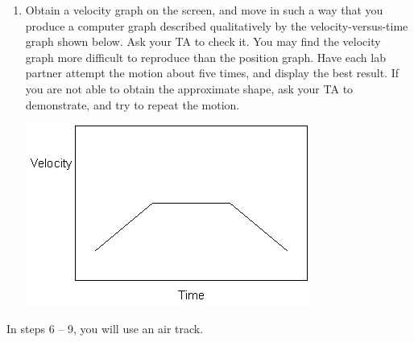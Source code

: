 \begin{enumerate}[label=\arabic*.]
\item Obtain a velocity graph on the screen, and move in such a way that you produce a computer graph described qualitatively by the velocity-versus-time graph shown below.  Ask your TA to check it.  You may find the velocity graph more difficult to reproduce than the position graph.  Have each lab partner attempt the motion about five times, and display the best result.  If you are not able to obtain the approximate shape, ask your TA to demonstrate, and try to repeat the motion.
\begin{center} \includegraphics*{imgs/6labs/6Alab/6Aexp2/exp2_fig3_fx.jpg} \end{center}

\end{enumerate}

In steps 6 -- 9, you will use an air track.

